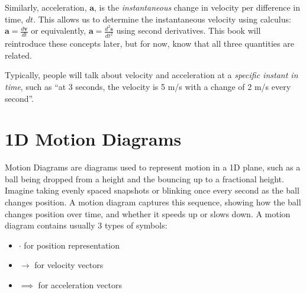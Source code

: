 Similarly, acceleration, $\mathbf a$, is the \emph{instantaneous} change in velocity per difference in time, $dt$. This allows us to determine the instantaneous velocity using calculus: $\mathbf a = \tfrac{d\mathbf v}{dt}$ or equivalently, $\mathbf a = \tfrac{d^2\mathbf s}{dt^2}$ using second derivatives. This book will reintroduce these concepts later, but for now, know that all three quantities are related. 

Typically, people will talk about velocity and acceleration at a \emph{specific instant in time}, such as ``at 3 seconds, the velocity is 5 m/s with a change of 2 m/s every second''.

\section{1D Motion Diagrams}
Motion Diagrams are diagrams used to represent motion in a 1D plane, such as a ball being dropped from a height and the bouncing up to a fractional height. Imagine taking evenly spaced snapshots or blinking once every second as the ball changes position. A motion diagram captures this sequence, showing how the ball changes position over time, and whether it speeds up or slows down. A motion diagram contains usually 3 types of symbols:
\begin{itemize}
    \item $\cdot$ for position representation
    \item $\rightarrow$ for velocity vectors
    \item $\implies$ for acceleration vectors
\end{itemize}

